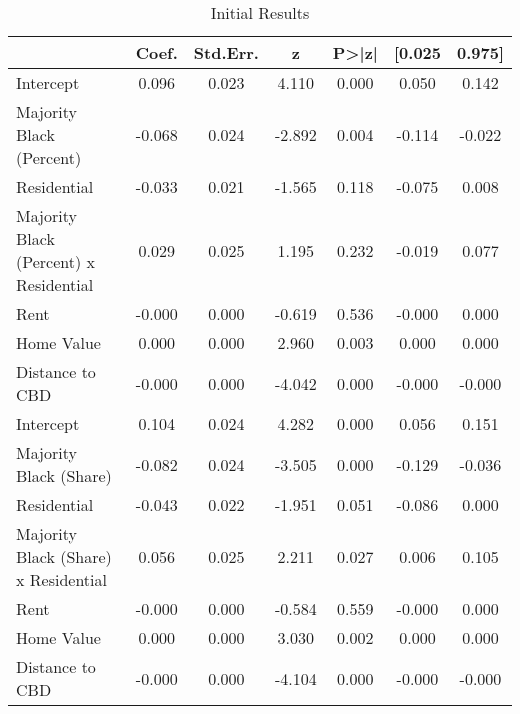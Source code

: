 \begin{table}[h]
\centering
\caption{Initial Results}
\label{tab:initial_results}
\begin{tabular}{lcccccc}
\toprule
 & Coef. & Std.Err. & z & P>|z| & [0.025 & 0.975] \\
\midrule
Intercept & 0.096 & 0.023 & 4.110 & 0.000 & 0.050 & 0.142 \\
\cline{1-1}
Majority Black (Percent) & -0.068 & 0.024 & -2.892 & 0.004 & -0.114 & -0.022 \\
\cline{1-1}
Residential & -0.033 & 0.021 & -1.565 & 0.118 & -0.075 & 0.008 \\
\cline{1-1}
Majority Black (Percent) x Residential & 0.029 & 0.025 & 1.195 & 0.232 & -0.019 & 0.077 \\
\cline{1-1}
Rent & -0.000 & 0.000 & -0.619 & 0.536 & -0.000 & 0.000 \\
\cline{1-1}
Home Value & 0.000 & 0.000 & 2.960 & 0.003 & 0.000 & 0.000 \\
\cline{1-1}
Distance to CBD & -0.000 & 0.000 & -4.042 & 0.000 & -0.000 & -0.000 \\
\cline{1-1}
Intercept & 0.104 & 0.024 & 4.282 & 0.000 & 0.056 & 0.151 \\
\cline{1-1}
Majority Black (Share) & -0.082 & 0.024 & -3.505 & 0.000 & -0.129 & -0.036 \\
\cline{1-1}
Residential & -0.043 & 0.022 & -1.951 & 0.051 & -0.086 & 0.000 \\
\cline{1-1}
Majority Black (Share) x Residential & 0.056 & 0.025 & 2.211 & 0.027 & 0.006 & 0.105 \\
\cline{1-1}
Rent & -0.000 & 0.000 & -0.584 & 0.559 & -0.000 & 0.000 \\
\cline{1-1}
Home Value & 0.000 & 0.000 & 3.030 & 0.002 & 0.000 & 0.000 \\
\cline{1-1}
Distance to CBD & -0.000 & 0.000 & -4.104 & 0.000 & -0.000 & -0.000 \\
\cline{1-1}
\bottomrule
\end{tabular}
\end{table}
